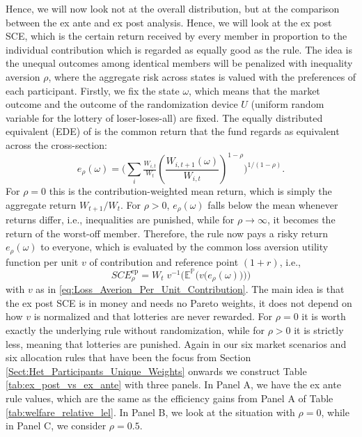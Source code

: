 \documentclass[11pt,a4paper]{article}
\theoremstyle{definition}
\theoremstyle{plain}
\theoremstyle{remark}
\newcommand{\E}{\mathbb{E}}
\renewcommand{\P}{\mathbb{P}}
\newcommand{\1}{\mathbf{1}}
\begin{document}
Hence, we will now look not at the overall distribution, but at the comparison between the ex ante and ex post analysis. Hence, we will look at the ex post SCE, which is the certain return received by every member in proportion to the individual contribution which is regarded as equally good as the rule. The idea is the unequal outcomes among identical members will be penalized with inequality aversion $\rho$, where the aggregate risk across states is valued with the preferences of each participant. Firstly, we fix the state $\omega$, which means that the market outcome and the outcome of the randomization device $U$ (uniform random variable for the lottery of loser-loses-all) are fixed. The equally distributed equivalent (EDE) of \citet{Atkinson_1970} is the common return that the fund regards as equivalent across the cross-section:
\begin{equation}
    e_\rho(\omega)=\Big(\sum_i \tfrac{W_{i,t}}{W_t} \left( \frac{W_{i,t+1}(\omega)}{W_{i,t}}\right)^{1-\rho}\Big)^{1/(1-\rho)}.
\end{equation}
For $\rho=0$ this is the contribution-weighted mean return, which is simply the aggregate return $W_{t+1}/W_t$. For $\rho>0$, $e_\rho(\omega)$ falls below the mean whenever returns differ, i.e., inequalities are punished, while for $\rho \to \infty$, it becomes the return of the worst-off member. Therefore, the rule now pays a risky return $e_\rho(\omega)$ to everyone, which is evaluated by the common loss aversion utility function per unit $v$ of contribution and reference point $(1+r)$, i.e.,
\begin{equation}
    SCE^{\text{ep}}_\rho=W_t\;v^{-1}\Big(\E^{\P}\big(v\big(e_\rho(\omega)\big)\big)\Big)
\end{equation}
with $v$ as in \eqref{eq:Loss_Averion_Per_Unit_Contribution}. The main idea is that the ex post SCE is in money and needs no Pareto weights, it does not depend on how $v$ is normalized and that lotteries are never rewarded. For $\rho=0$ it is worth exactly the underlying rule without randomization, while for $\rho>0$ it is strictly less, meaning that lotteries are punished. Again in our six market scenarios and six allocation rules that have been the focus from Section \ref{Sect:Het_Participants_Unique_Weights} onwards we construct Table \ref{tab:ex_post_vs_ex_ante} with three panels. In Panel A, we have the ex ante rule values, which are the same as the efficiency gains from Panel A of Table \ref{tab:welfare_relative_lel}. In Panel B, we look at the situation with $\rho=0$, while in Panel C, we consider $\rho=0.5$.
\end{document}
